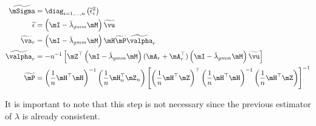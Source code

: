 \documentclass[english,12pt]{book}\usepackage[]{graphicx}\usepackage[]{xcolor}
\begin{document}
\begin{equation}
  \begin{aligned}
    \widetilde{\mSigma}  & = \diag_{i=1,...,n}\left(\widetilde{\epsilon}_i^2\right) \\
    \widetilde{\epsilon} & = \left(\mI - \breve{\lambda}_{gmm}\mM \right)\widetilde{\vu} \\
    \widetilde{\va}_r & = \left(\mI - \breve{\lambda}_{gmm}\mM \right)\mH\widetilde{\mP}\widetilde{\valpha}_r \\
    \widetilde{\valpha}_r & = - n^{-1}\left[\mZ^\top\left(\mI - \breve{\lambda}_{gmm}\mM \right)(\mA_r + \mA_r^\top)\left(\mI - \breve{\lambda}_{gmm}\mM \right)\widetilde{\vu}\right] \\
    \widetilde{\mP} & = \left(\frac{1}{n}\mH^\top\mH\right)^{-1}\left(\frac{1}{n}\mH_n^\top\mZ_n \right)\left[\left(\frac{1}{n}\mH^\top\mZ \right)^\top\left(\frac{1}{n}\mH^\top\mH\right)^{-1}\left(\frac{1}{n}\mH^\top\mZ \right)\right]^{-1}
  \end{aligned}
\end{equation}

It is important to note that this step is not necessary since the previous estimator of $\lambda$ is already consistent. 
\end{document}
